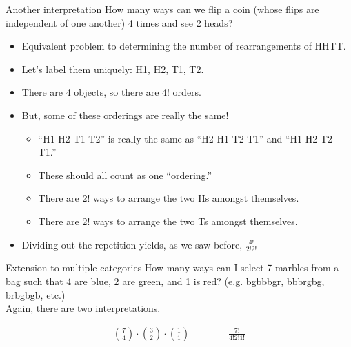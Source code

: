 \documentclass[aspectratio=169]{../latex_main/tntbeamer}  %
\begin{document}
	\begin{frame}{Another interpretation}
	    How many ways can we flip a coin (whose flips are independent of one another) 4 times and see 2 heads?
        \begin{itemize}
            \item Equivalent problem to determining the number of rearrangements of HHTT.
            \item Let’s label them uniquely: H1, H2, T1, T2.
            \item There are 4 objects, so there are 4! orders.
            \item But, some of these orderings are really the same!
            \begin{itemize}
                \item “H1 H2 T1 T2” is really the same as “H2 H1 T2 T1” and “H1 H2 T2 T1.”
                \item These should all count as one “ordering.”
                \item There are 2! ways to arrange the two Hs amongst themselves.
                \item There are 2! ways to arrange the two Ts amongst themselves.
            \end{itemize}
            \item Dividing out the repetition yields, as we saw before, $\frac{4!}{2!2!}$
        \end{itemize}

	\end{frame}
	
	\begin{frame}{Extension to multiple categories}
	    How many ways can I select 7 marbles from a bag such that 4 are blue, 2 are green, and 1 is red? (e.g. bgbbbgr, bbbrgbg, brbgbgb, etc.)\\
	    \bigskip
	    Again, there are two interpretations.

        \begin{align*}
            \binom{7}{4}\cdot \binom{3}{2} \cdot \binom{1}{1} \qquad  \qquad \frac{7!}{4!2!1!}
        \end{align*}

	\end{frame}
	
	
	
\end{document}
